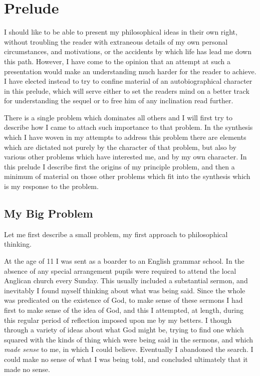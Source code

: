 \mainmatter
\def\rbjidprelude{$$Id: prelude.tex,v 1.2 2010/01/25 13:11:02 rbj Exp $$}
\chapter{Prelude}\label{Prelude}

I should like to be able to present my philosophical ideas in their own right, without troubling the reader with extraneous details of my own personal circumstances, and motivations, or the accidents by which life has lead me down this path.
However, I have come to the opinion that an attempt at such a presentation would make an understanding much harder for the reader to achieve.
I have elected instead to try to confine material of an autobiographical character in this prelude, which will serve either to set the readers mind on a better track for understanding the sequel or to free him of any inclination read further.

There is a single problem which dominates all others and I will first try to describe how I came to attach such importance to that problem.
In the synthesis which I have woven in my attempts to address this problem there are elements which are dictated not purely by the character of that problem, but also by various other problems which have interested me, and by my own character.
In this prelude I describe first the origins of my principle problem, and then a minimum of material on those other problems which fit into the synthesis which is my response to the problem.

\section{My Big Problem}

Let me first describe a small problem, my first approach to philosophical thinking.

At the age of 11 I was sent as a boarder to an English grammar school.
In the absence of any special arrangement pupils were required to attend the local Anglican church every Sunday.
This usually included a substantial sermon, and inevitably I found myself thinking about what was being said.
Since the whole was predicated on the existence of God, to make sense of these sermons I had first to make sense of the idea of God, and this I attempted, at length, during this regular period of reflection imposed upon me by my betters.
I though through a variety of ideas about what God might be, trying to find one which squared with the kinds of thing which were being said in the sermons, and which {\it made sense} to me, in which I could believe.
Eventually I abandoned the search.
I could make no sense of what I was being told, and concluded ultimately that it made no sense.

